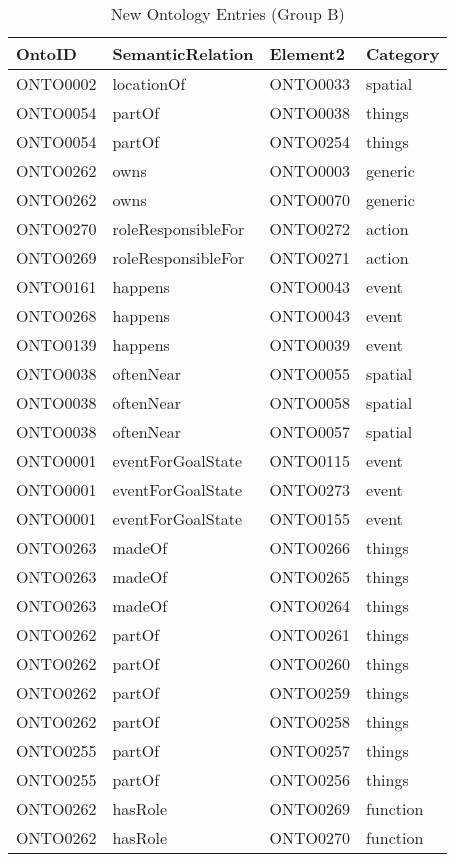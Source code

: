 \begin{table}[H]   %
\centering
\caption{New Ontology Entries (Group B)} \vspace{0.25em}
\begin{tabular}{|l|l|l|l|} \hline
\textbf{OntoID} & \textbf{SemanticRelation} & \textbf{Element2} & \textbf{Category} \\ \hline
ONTO0002 & locationOf & ONTO0033 & spatial \\ \hline
ONTO0054 & partOf & ONTO0038 & things \\ \hline
ONTO0054 & partOf & ONTO0254 & things \\ \hline
ONTO0262 & owns & ONTO0003 & generic \\ \hline
ONTO0262 & owns & ONTO0070 & generic \\ \hline
ONTO0270 & roleResponsibleFor & ONTO0272 & action \\ \hline
ONTO0269 & roleResponsibleFor & ONTO0271 & action \\ \hline
ONTO0161 & happens & ONTO0043 & event \\ \hline
ONTO0268 & happens & ONTO0043 & event \\ \hline
ONTO0139 & happens & ONTO0039 & event \\ \hline
ONTO0038 & oftenNear & ONTO0055 & spatial \\ \hline
ONTO0038 & oftenNear & ONTO0058 & spatial \\ \hline
ONTO0038 & oftenNear & ONTO0057 & spatial \\ \hline
ONTO0001 & eventForGoalState & ONTO0115 & event \\ \hline
ONTO0001 & eventForGoalState & ONTO0273 & event \\ \hline
ONTO0001 & eventForGoalState & ONTO0155 & event \\ \hline
ONTO0263 & madeOf & ONTO0266 & things \\ \hline
ONTO0263 & madeOf & ONTO0265 & things \\ \hline
ONTO0263 & madeOf & ONTO0264 & things \\ \hline
ONTO0262 & partOf & ONTO0261 & things \\ \hline
ONTO0262 & partOf & ONTO0260 & things \\ \hline
ONTO0262 & partOf & ONTO0259 & things \\ \hline
ONTO0262 & partOf & ONTO0258 & things \\ \hline
ONTO0255 & partOf & ONTO0257 & things \\ \hline
ONTO0255 & partOf & ONTO0256 & things \\ \hline
ONTO0262 & hasRole & ONTO0269 & function \\ \hline
ONTO0262 & hasRole & ONTO0270 & function \\ \hline
\end{tabular}
\label{tab:grpbonto}
\end{table}

